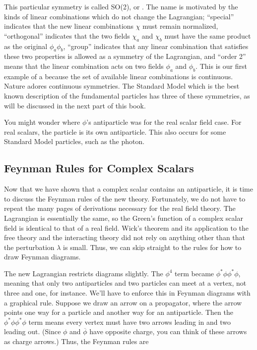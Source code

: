 This particular symmetry is called SO(2), or . The name is motivated by the kinds of linear combinations which do not change the Lagrangian; ``special'' indicates that the new linear combinations $\chi$ must remain normalized, ``orthogonal'' indicates that the two fields $\chi_a$ and $\chi_b$ must have the same product as the original $\phi_a\phi_b$, ``group'' indicates that any linear combination that satisfies these two properties is allowed as a symmetry of the Lagrangian, and ``order 2'' means that the linear combination acts on two fields $\phi_a$ and $\phi_b$. This is our first example of a  because the set of available linear combinations is continuous. Nature adores continuous symmetries. The Standard Model which is the best known description of the fundamental particles has three of these symmetries, as will be discussed in the next part of this book.

You might wonder where $\phi$'s antiparticle was for the real scalar field case. For real scalars, the particle is its own antiparticle. This also occurs for some Standard Model particles, such as the photon.

\subsection{Feynman Rules for Complex Scalars}

Now that we have shown that a complex scalar contains an antiparticle, it is time to discuss the Feynman rules of the new theory. Fortunately, we do not have to repeat the many pages of derivations necessary for the real field theory. The Lagrangian is essentially the same, so the Green's function of a complex scalar field is identical to that of a real field. Wick's theorem and its application to the free theory and the interacting theory did not rely on anything other than that the perturbation $\lambda$ is small. Thus, we can skip straight to the rules for how to draw Feynman diagrams.

The new Lagrangian restricts diagrams slightly. The $\phi^4$ term became $\phi^*\phi \phi^*\phi$, meaning that only two antiparticles and two particles can meet at a vertex, not three and one, for instance. We'll have to enforce this in Feynman diagrams with a graphical rule. Suppose we draw an arrow on a propagator, where the arrow points one way for a particle and another way for an antiparticle. Then the $\phi^*\phi \phi^*\phi$ term means every vertex must have two arrows leading in and two leading out. (Since $\phi$ and $\overline \phi$ have opposite charge, you can think of these arrows as charge arrows.) Thus, the Feynman rules are 

